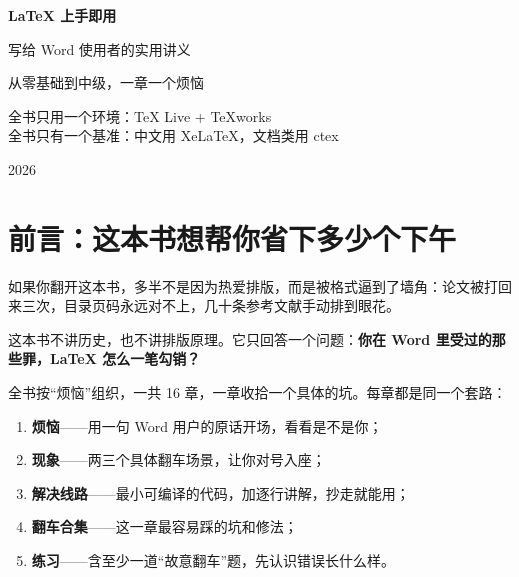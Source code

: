 \documentclass[UTF8, 12pt, a4paper, oneside]{ctexbook}
\begin{document}
\begin{titlepage}
  \centering
  \vspace*{3.5cm}
  {\sffamily\bfseries\fontsize{40pt}{48pt}\selectfont\color{bookblue} LaTeX 上手即用\par}
  \vspace{1.2cm}
  {\sffamily\Large 写给 Word 使用者的实用讲义\par}
  \vspace{0.5cm}
  {\sffamily\large 从零基础到中级，一章一个烦恼\par}
  \vspace{3cm}
  \begin{tcolorbox}[width=0.72\textwidth, colback=bookgray, colframe=bookgray,
                    boxrule=0pt, arc=2pt, left=12pt, right=12pt, top=10pt, bottom=10pt]
    \centering\small
    全书只用一个环境：TeX Live + TeXworks\\
    全书只有一个基准：中文用 XeLaTeX，文档类用 ctex
  \end{tcolorbox}
  \vfill
  {\sffamily\large 2026\par}
  \vspace{0.6cm}
\end{titlepage}

\frontmatter
\pagestyle{plain}

\chapter{前言：这本书想帮你省下多少个下午}

如果你翻开这本书，多半不是因为热爱排版，而是被格式逼到了墙角：论文被打回来三次，目录页码永远对不上，几十条参考文献手动排到眼花。

这本书不讲历史，也不讲排版原理。它只回答一个问题：\textbf{你在 Word 里受过的那些罪，LaTeX 怎么一笔勾销？}

全书按“烦恼”组织，一共 16 章，一章收拾一个具体的坑。每章都是同一个套路：

\begin{enumerate}
  \item \textbf{烦恼}——用一句 Word 用户的原话开场，看看是不是你；
  \item \textbf{现象}——两三个具体翻车场景，让你对号入座；
  \item \textbf{解决线路}——最小可编译的代码，加逐行讲解，抄走就能用；
  \item \textbf{翻车合集}——这一章最容易踩的坑和修法；
  \item \textbf{练习}——含至少一道“故意翻车”题，先认识错误长什么样。
\end{enumerate}
\end{document}
